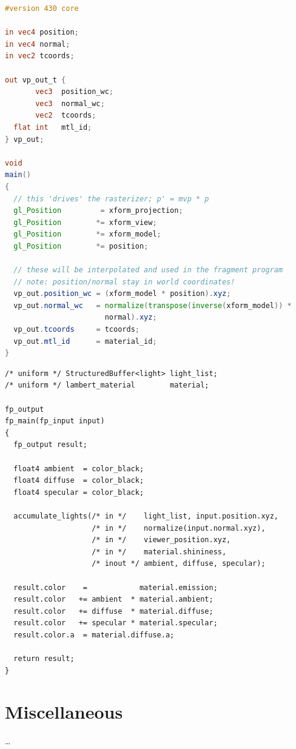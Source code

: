 \begin{lstlisting}[language=glsl,caption={A GLSL source-code fragment}]
#version 430 core

in vec4 position;
in vec4 normal;
in vec2 tcoords;

out vp_out_t {
       vec3  position_wc;
       vec3  normal_wc;
       vec2  tcoords;
  flat int   mtl_id;
} vp_out;

void
main()
{
  // this 'drives' the rasterizer; p' = mvp * p
  gl_Position         = xform_projection;
  gl_Position        *= xform_view;
  gl_Position        *= xform_model;
  gl_Position        *= position;

  // these will be interpolated and used in the fragment program
  // note: position/normal stay in world coordinates!
  vp_out.position_wc = (xform_model * position).xyz;
  vp_out.normal_wc   = normalize(transpose(inverse(xform_model)) *
                       normal).xyz;
  vp_out.tcoords     = tcoords;
  vp_out.mtl_id      = material_id;
}
\end{lstlisting}
\begin{lstlisting}[language=hlsl,caption={A HLS source-code fragment}]
/* uniform */ StructuredBuffer<light> light_list;
/* uniform */ lambert_material        material;

fp_output
fp_main(fp_input input)
{
  fp_output result;

  float4 ambient  = color_black;
  float4 diffuse  = color_black;
  float4 specular = color_black;

  accumulate_lights(/* in */    light_list, input.position.xyz,
                    /* in */    normalize(input.normal.xyz),
                    /* in */    viewer_position.xyz,
                    /* in */    material.shininess,
                    /* inout */ ambient, diffuse, specular);

  result.color    =            material.emission;
  result.color   += ambient  * material.ambient;
  result.color   += diffuse  * material.diffuse;
  result.color   += specular * material.specular;
  result.color.a  = material.diffuse.a;

  return result;
}
\end{lstlisting}
\par

\section{Miscellaneous}
\label{app:how-to:miscellaneous}

\ldots
\par


